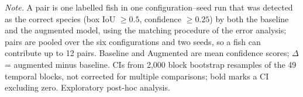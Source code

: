 \begin{table}[htbp]
    \centering
    \caption[Confidence of focus-species detections found in both conditions]{Change in confidence for focus-species fish detected correctly by both the baseline and the augmented model (exploratory analysis).}
    \label{tab:conf_tp}
    \small
    \setlength{\tabcolsep}{4pt}
    \renewcommand{\arraystretch}{1.2}

    \vspace{3pt}
    \begin{minipage}{\linewidth}
    \footnotesize\textit{Note.} A pair is one labelled fish in one configuration--seed run that was detected as the correct
    species (box IoU $\geq 0.5$, confidence $\geq 0.25$) by both the baseline and the augmented model, using the matching
    procedure of the error analysis; pairs are pooled over the six configurations and two seeds, so a fish can contribute up
    to 12 pairs. Baseline and Augmented are mean confidence scores; $\Delta$ = augmented minus baseline. CIs from 2,000 block
    bootstrap resamples of the 49 temporal blocks, not corrected for multiple comparisons; bold marks a CI excluding zero. Exploratory post-hoc analysis.
    \end{minipage}
\end{table}

